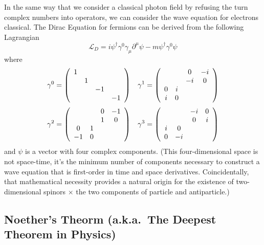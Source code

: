 \documentclass[12pt]{article}
\begin{document}
In the same way that we consider a classical photon field by refusing
the turn complex numbers into operators, we can consider the wave
equation for electrons classical.  The Dirac Equation for fermions can
be derived from the following Lagrangian
\begin{equation}
  \mathcal{L}_D = i \psi^\dagger \gamma^0 \gamma_\mu \partial^\mu \psi
  - m \psi^\dagger \gamma^0 \psi
\end{equation}
where
\begin{equation}
  \gamma^0 = \left(\begin{array}{c c c c}
1 & & & \\
 & 1 & & \\
 & & -1 & \\
 & & & -1 \end{array}\right) \mbox{\hspace{0.3 cm}}
  \gamma^1 = \left(\begin{array}{c c c c}
 & & 0 & -i \\
 & & -i & 0\\
0 & i & & \\
i & 0 & & \end{array}\right)
\end{equation}
\begin{equation}
  \gamma^2 = \left(\begin{array}{c c c c}
 & & 0 & -1 \\
 & & 1 & 0 \\
0 & 1 & & \\
-1 & 0& & \end{array}\right) \mbox{\hspace{0.3 cm}}
  \gamma^3 = \left(\begin{array}{c c c c}
 & & -i & 0 \\
 & & 0 & i\\
i & 0 & & \\
0 & -i & & \end{array}\right)
\end{equation}
and $\psi$ is a vector with four complex components.  (This
four-dimensional space is not space-time, it's the minimum number of
components necessary to construct a wave equation that is first-order
in time and space derivatives.  Coincidentally, that mathematical
necessity provides a natural origin for the existence of
two-dimensional spinors $\times$ the two components of particle and
antiparticle.)

\subsection{Noether's Theorm (a.k.a.\ The Deepest Theorem in Physics)}
\end{document}

